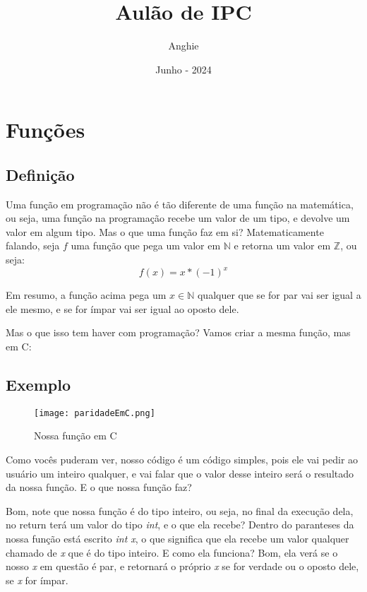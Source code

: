 \documentclass{article}
\title{Aulão de IPC}
\author{Anghie}
\date{Junho - 2024}
\begin{document}
    \maketitle

    \tableofcontents
    \newpage

    \section{Funções}
    \subsection*{Definição}
    Uma função em programação não é tão diferente de uma função
    na matemática, ou seja, uma função na programação recebe um
    valor de um tipo, e devolve um valor em algum tipo.
    Mas o que uma função faz em si? Matematicamente falando,
    seja $f$ uma função que pega um valor em $\mathbb{N}$ e
    retorna um valor em $\mathbb{Z}$, ou seja:
    \begin{equation*}
        f(x) = x * (-1)^x
    \end{equation*}

    Em resumo, a função acima pega um $x\in\mathbb{N}$ qualquer
    que se for par vai ser igual a ele mesmo, e se for ímpar
    vai ser igual ao oposto dele.

    Mas o que isso tem haver com programação? Vamos criar a mesma
    função, mas em C:

    \subsection*{Exemplo}
    \begin{figure}[h]
        \centering
        \texttt{[image: paridadeEmC.png]}
        \caption{Nossa função em C}
        \label{fig:paridadeEmC}
    \end{figure}
    \newpage

    Como vocês puderam ver, nosso código é um código simples,
    pois ele vai pedir ao usuário um inteiro qualquer,
    e vai falar que o valor desse inteiro será o resultado da
    nossa função. E o que nossa função faz?

    Bom, note que nossa função é do tipo inteiro, ou seja,
    no final da execução dela, no return terá um valor do tipo
    \emph{int}, e o que ela recebe? Dentro do paranteses da
    nossa função está escrito \emph{int x}, o que significa que
    ela recebe um valor qualquer chamado de \emph{x} que é do
    tipo inteiro.
    E como ela funciona? Bom, ela verá se o nosso \emph{x} em
    questão é par, e retornará o próprio \emph{x} se for verdade
    ou o oposto dele, se \emph{x} for ímpar.
    \newpage
\end{document}
